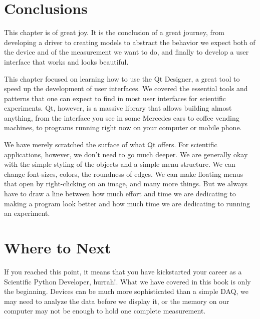 
\section{Conclusions}\label{sec:conclusions}
This chapter is of great joy. It is the conclusion of a great journey, from developing a driver to creating models to abstract the behavior we expect both of the device and of the measurement we want to do, and finally to develop a user interface that works and looks beautiful.

This chapter focused on learning how to use the Qt Designer, a great tool to speed up the development of user interfaces. We covered the essential tools and patterns that one can expect to find in most user interfaces for scientific experiments. Qt, however, is a massive library that allows building almost anything, from the interface you see in some Mercedes cars to coffee vending machines, to programs running right now on your computer or mobile phone.

We have merely scratched the surface of what Qt offers. For scientific applications, however, we don't need to go much deeper. We are generally okay with the simple styling of the objects and a simple menu structure. We can change font-sizes, colors, the roundness of edges. We can make floating menus that open by right-clicking on an image, and many more things. But we always have to draw a line between how much effort and time we are dedicating to making a program look better and how much time we are dedicating to running an experiment.

\section{Where to Next}\label{sec:where-to-next}
If you reached this point, it means that you have kickstarted your career as a Scientific Python Developer, hurrah!. What we have covered in this book is only the beginning. Devices can be much more sophisticated than a simple DAQ, we may need to analyze the data before we display it, or the memory on our computer may not be enough to hold one complete measurement.

